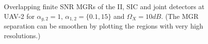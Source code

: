\begin{figure}[]
\centering
{}
\hfil
{}
\caption{Overlapping finite SNR MGRs of the II, SIC and joint detectors at UAV-2 for $\alpha_{g,2}=1$, $\alpha_{1,2}=\{0.1,15\}$ and $\Omega_X=10dB$. (The MGR separation can be smoothen by plotting the regions with very high resolutions.)}
\label{fig:JD_HBD_UCS_var_mgr_uav2}
\end{figure}





